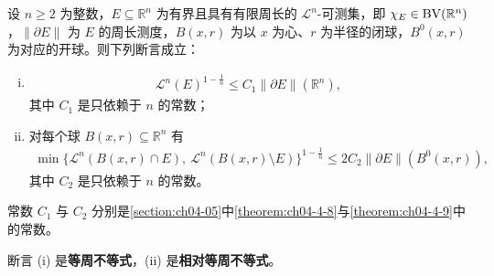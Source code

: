 ﻿\documentclass[../../main.tex]{subfiles}%
\begin{document}
\begin{theorem}[等周不等式]\label{theorem:ch05-5-11}
设 $n\geqslant2$ 为整数，$E\subseteq\mathbb{R}^n$ 为有界且具有有限周长的 $\mathcal{L}^n$-可测集，即 $\chi_E\in\mathrm{BV}(\mathbb{R}^n)$，$\lVert\partial E\rVert$ 为 $E$ 的周长测度，$B(x,r)$ 为以 $x$ 为心、$r$ 为半径的闭球，$B^0(x,r)$ 为对应的开球。则下列断言成立：
\begin{enumerate}[(i)]
\item
\begin{align*}
\mathcal{L}^n(E)^{1-\frac1n}\leqslant C_1\lVert\partial E\rVert(\mathbb{R}^n),
\end{align*}
其中 $C_1$ 是只依赖于 $n$ 的常数；
\item 对每个球 $B(x,r)\subseteq\mathbb{R}^n$ 有
\begin{align*}
\min\bigl\{\mathcal{L}^n(B(x,r)\cap E),\ \mathcal{L}^n(B(x,r)\setminus E)\bigr\}^{1-\frac1n}\leqslant2C_2\lVert\partial E\rVert(B^0(x,r)),
\end{align*}
其中 $C_2$ 是只依赖于 $n$ 的常数。
\end{enumerate}
\end{theorem}


常数 $C_1$ 与 $C_2$ 分别是\cref{section:ch04-05}中\cref{theorem:ch04-4-8}与\cref{theorem:ch04-4-9}中的常数。%

\begin{remark}\label{remark:ch05-thm-5-11-名称}
断言 (i) 是\textbf{等周不等式}，(ii) 是\textbf{相对等周不等式}。
\end{remark}
\end{document}
